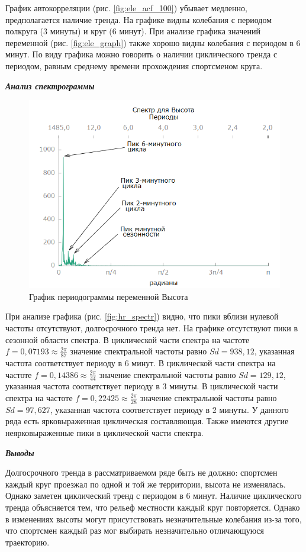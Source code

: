 \documentclass[a4paper,12pt]{article}
\begin{document}
График автокорреляции (рис. \ref{fig:ele_acf_100}) убывает медленно, предполагается наличие тренда. На графике видны колебания с периодом полкруга (3 минуты) и круг (6 минут). При анализе графика значений переменной (рис. \ref{fig:ele_graph}) также хорошо видны колебания с периодом в 6 минут. По виду графика можно говорить о наличии циклического тренда с периодом, равным среднему времени прохождения спортсменом круга.

\textbf{\textit{Анализ спектрограммы}}

\begin{figure}[H]
	\centering
	\includegraphics[width=0.5\linewidth]{../[graphics]/ele_spectr}
	\caption{График периодограммы переменной Высота}
	\label{fig:ele_spectr}
\end{figure}

При анализе графика (рис. \ref{fig:hr_spectr}) видно, что пики вблизи нулевой частоты отсутствуют, долгосрочного тренда нет. На графике отсутствуют пики в сезонной области спектра. 
В циклической части спектра на частоте $f = 0,07193 \approx \frac{2 \pi}{87}$ значение спектральной частоты равно $Sd = 938,12$, указанная частота соответствует периоду в 6 минут. 
В циклической части спектра на частоте $f = 0,14386 \approx \frac{2 \pi}{44}$ значение спектральной частоты равно $Sd = 129,12$, указанная частота соответствует периоду в 3 минуты.
В циклической части спектра на частоте $f = 0,22425 \approx \frac{2 \pi}{28}$ значение спектральной частоты равно $Sd = 97,627$, указанная частота соответствует периоду в 2 минуты.
У данного ряда есть ярковыраженная циклическая составляющая.
Также имеются другие неярковыраженные пики в циклической части спектра.


\textbf{\textit{Выводы}}

Долгосрочного тренда в рассматриваемом ряде быть не должно: спортсмен каждый круг проезжал по одной и той же территории, высота не изменялась. 
Однако заметен циклический тренд с периодом в 6 минут. Наличие циклического тренда объясняется тем, что рельеф местности каждый круг повторяется. Однако в изменениях высоты могут присутствовать незначительные колебания из-за того, что спортсмен каждый раз мог выбирать незначительно отличающуюся траекторию.
\end{document}

